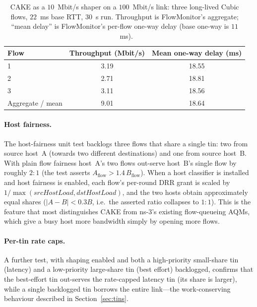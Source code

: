 \documentclass[sigconf,nonacm]{acmart}
\begin{document}
\begin{table}[t]
\caption{CAKE as a $10$~Mbit/s shaper on a $100$~Mbit/s link: three long-lived
Cubic flows, $22$~ms base RTT, $30$~s run. Throughput is FlowMonitor's
aggregate; ``mean delay'' is FlowMonitor's per-flow one-way delay (base one-way
is $11$~ms).}
\label{tab:bufferbloat}
\small
\begin{tabular}{@{}lcc@{}}
\toprule
Flow & Throughput (Mbit/s) & Mean one-way delay (ms)\\
\midrule
1         & 3.19 & 18.55\\
2         & 2.71 & 18.81\\
3         & 3.11 & 18.56\\
\midrule
Aggregate / mean & 9.01 & 18.64\\
\bottomrule
\end{tabular}
\end{table}

\paragraph{Host fairness.} The host-fairness unit test backlogs three flows that
share a single tin: two from source host~A (towards two different destinations)
and one from source host~B. With plain flow fairness host~A's two flows out-serve
host~B's single flow by roughly $2{:}1$ (the test asserts $\textit{A}_{\text{flow}}>1.4\,\textit{B}_{\text{flow}}$). When a host classifier is
installed and host fairness is enabled, each flow's per-round DRR grant is
scaled by $1/\max(\textit{srcHostLoad}, \textit{dstHostLoad})$, and the two
hosts obtain approximately equal shares ($|\textit{A}-\textit{B}|<0.3\textit{B}$,
i.e.\ the asserted ratio collapses to $1{:}1$). This is the feature that most
distinguishes CAKE from ns-3's existing flow-queueing AQMs, which give a busy
host more bandwidth simply by opening more flows.

\paragraph{Per-tin rate caps.} A further test, with shaping enabled and both a
high-priority small-share tin (latency) and a low-priority large-share tin (best
effort) backlogged, confirms that the best-effort tin out-serves the
rate-capped latency tin (its share is larger), while a single backlogged tin
borrows the entire link---the work-conserving behaviour described in
Section~\ref{sec:tins}.
\end{document}
